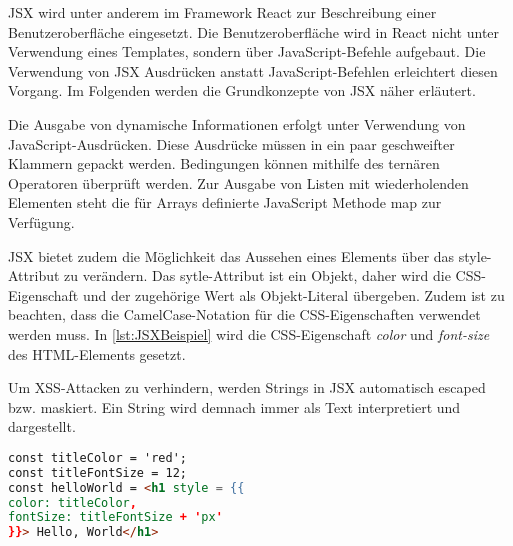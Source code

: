 JSX wird unter anderem im Framework React zur Beschreibung einer Benutzeroberfläche eingesetzt. Die Benutzeroberfläche wird in React nicht unter Verwendung eines Templates, sondern über JavaScript-Befehle aufgebaut. Die Verwendung von JSX Ausdrücken anstatt JavaScript-Befehlen erleichtert diesen Vorgang. Im Folgenden werden die Grundkonzepte von JSX näher erläutert.

Die Ausgabe von dynamische Informationen erfolgt unter Verwendung von JavaScript-Ausdrücken. Diese Ausdrücke müssen in ein paar geschweifter Klammern gepackt werden. Bedingungen können mithilfe des ternären Operatoren überprüft werden. Zur Ausgabe von Listen mit wiederholenden Elementen steht die für Arrays definierte JavaScript Methode map zur Verfügung.

JSX bietet zudem die Möglichkeit das Aussehen eines Elements über das style-Attribut zu verändern. Das sytle-Attribut ist ein Objekt, daher wird die CSS-Eigenschaft und der zugehörige Wert als Objekt-Literal übergeben. Zudem ist zu beachten, dass die CamelCase-Notation für die CSS-Eigenschaften verwendet werden muss. In \autoref{lst:JSXBeispiel} wird die CSS-Eigenschaft \textit{color} und \textit{font-size} des HTML-Elements gesetzt.

Um XSS-Attacken zu verhindern, werden Strings in JSX automatisch escaped bzw. maskiert. Ein String wird demnach immer als Text interpretiert und dargestellt.\autocites[vgl.][59\psqq]{Zeigermann.2016}[vgl.][65\psqq]{Stefanov.2017} 

\begin{lstlisting}[caption=Beispiel für die Verwendung von JSX, label=lst:JSXBeispiel, language=HTML]
const titleColor = 'red';
const titleFontSize = 12;
const helloWorld = <h1 style = {{
color: titleColor,
fontSize: titleFontSize + 'px'
}}> Hello, World</h1>
\end{lstlisting}